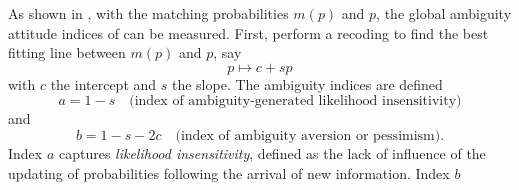 \documentclass[]{article}
\begin{document}
As shown in \citet{dimmock2016ambiguity}, with the matching probabilities $m(p)$ and $p$, the global ambiguity attitude indices of \citet{abdellaoui2011} can be measured. First, perform a recoding to find the best fitting line between $m(p)$ and $p$, say
\[p\mapsto c+sp \]
with $c$ the intercept and $s$ the slope. The ambiguity indices are defined
\begin{equation}
	a= 1-s\quad\text{(index of ambiguity-generated likelihood insensitivity)}
\end{equation}
and
\begin{equation}
	b = 1-s-2c\quad\text{(index of ambiguity aversion or pessimism).}
\end{equation}
Index $a$ captures \textit{likelihood insensitivity}, defined as the lack of influence of the updating of probabilities following the arrival of new information. Index $b$ 








\pagebreak



\end{document}
